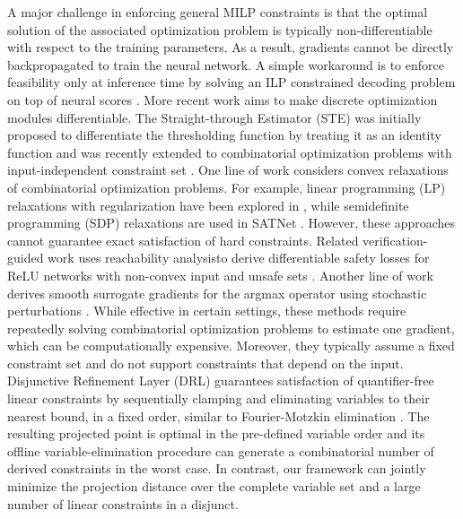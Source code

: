 \documentclass{article}
\theoremstyle{plain}
\theoremstyle{definition}
\theoremstyle{remark}
\begin{document}
A major challenge in enforcing general MILP constraints is that the optimal solution of the associated optimization problem is typically non-differentiable with respect to the training parameters. As a result, gradients cannot be directly backpropagated to train the neural network. A simple workaround is to enforce feasibility only at inference time by solving an ILP constrained decoding problem on top of neural scores \cite{roth2005integer}. More recent work aims to make discrete optimization modules differentiable. The Straight-through Estimator (STE) was initially proposed to differentiate the thresholding function by treating it as an identity function and was recently extended to combinatorial optimization problems with input-independent constraint set \cite{sahoo2023backpropagation}.   One line of work considers convex relaxations of combinatorial optimization problems. For example, linear programming (LP) relaxations with regularization have been explored in \cite{wilder2019melding, Ferber_Wilder_Dilkina_Tambe_2020, mckenzie2024differentiating}, while semidefinite programming (SDP) relaxations are used in SATNet \cite{wang2019satnetbridgingdeeplearning}. However, these approaches cannot guarantee exact satisfaction of hard constraints. Related verification-guided work uses reachability analysisto derive differentiable safety losses for ReLU networks with non-convex input and unsafe sets \cite{11312423}. Another line of work derives smooth surrogate gradients for the argmax operator using stochastic perturbations \cite{berthet2020learning}. While effective in certain settings, these methods require repeatedly solving combinatorial optimization problems to estimate one gradient, which can be computationally expensive. Moreover, they typically assume a fixed constraint set and do not support constraints that depend on the input. Disjunctive Refinement Layer (DRL) \cite{stoian2025beyond} guarantees satisfaction of quantifier-free linear constraints by sequentially clamping and eliminating variables to their nearest bound, in a fixed order, similar to Fourier-Motzkin elimination \cite{R-366-PR}. The resulting projected point is optimal in the pre-defined variable order and its offline variable-elimination procedure can generate a combinatorial number of derived constraints in the worst case. In contrast, our framework can jointly minimize the projection distance over the complete variable set and a large number of linear constraints in a disjunct.
\end{document}
